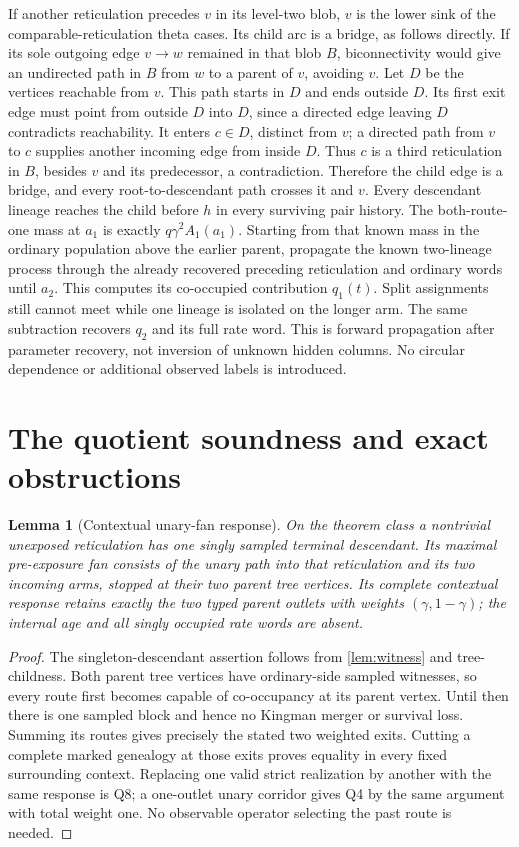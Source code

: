 \documentclass[11pt]{article}
\newtheorem{lemma}[theorem]{Lemma}
\begin{document}
If another reticulation precedes $v$ in its level-two blob, $v$ is the lower sink of the comparable-reticulation theta cases. Its child arc is a bridge, as follows directly. If its sole outgoing edge $v\to w$ remained in that blob $B$, biconnectivity would give an undirected path in $B$ from $w$ to a parent of $v$, avoiding $v$. Let $D$ be the vertices reachable from $v$. This path starts in $D$ and ends outside $D$. Its first exit edge must point from outside $D$ into $D$, since a directed edge leaving $D$ contradicts reachability. It enters $c\in D$, distinct from $v$; a directed path from $v$ to $c$ supplies another incoming edge from inside $D$. Thus $c$ is a third reticulation in $B$, besides $v$ and its predecessor, a contradiction. Therefore the child edge is a bridge, and every root-to-descendant path crosses it and $v$. Every descendant lineage reaches the child before $h$ in every surviving pair history. The both-route-one mass at $a_1$ is exactly $q\gamma^2A_1(a_1)$. Starting from that known mass in the ordinary population above the earlier parent, propagate the known two-lineage process through the already recovered preceding reticulation and ordinary words until $a_2$. This computes its co-occupied contribution $q_1(t)$. Split assignments still cannot meet while one lineage is isolated on the longer arm. The same subtraction recovers $q_2$ and its full rate word. This is forward propagation after parameter recovery, not inversion of unknown hidden columns. No circular dependence or additional observed labels is introduced.

\section{The quotient soundness and exact obstructions}
\label{sec:quotient}
\begin{lemma}[Contextual unary-fan response]
\label{thm:fan-context}
On the theorem class a nontrivial unexposed reticulation has one singly sampled terminal descendant. Its maximal pre-exposure fan consists of the unary path into that reticulation and its two incoming arms, stopped at their two parent tree vertices. Its complete contextual response retains exactly the two typed parent outlets with weights $(\gamma,1-\gamma)$; the internal age and all singly occupied rate words are absent.
\end{lemma}
\begin{proof}
The singleton-descendant assertion follows from \cref{lem:witness} and tree-childness. Both parent tree vertices have ordinary-side sampled witnesses, so every route first becomes capable of co-occupancy at its parent vertex. Until then there is one sampled block and hence no Kingman merger or survival loss. Summing its routes gives precisely the stated two weighted exits. Cutting a complete marked genealogy at those exits proves equality in every fixed surrounding context. Replacing one valid strict realization by another with the same response is Q8; a one-outlet unary corridor gives Q4 by the same argument with total weight one. No observable operator selecting the past route is needed.
\end{proof}
\end{document}
